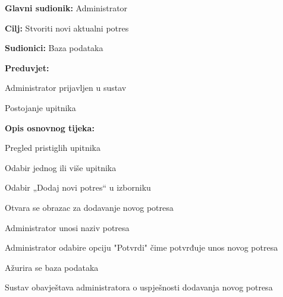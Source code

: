 					\noindent {}
					\begin{packed_item}
	
						\item \textbf{Glavni sudionik:} Administrator
						\item \textbf{Cilj:} Stvoriti novi aktualni potres
						\item \textbf{Sudionici:} Baza podataka
						\item \textbf{Preduvjet:} 
						\begin{packed_item}
							\item Administrator prijavljen u sustav
							\item Postojanje upitnika
						\end{packed_item}
						            
						\item \textbf{Opis osnovnog tijeka:}
						
						\item[] \begin{packed_enum}
	
							\item Pregled pristiglih upitnika
							\item Odabir jednog ili više upitnika
							\item Odabir „Dodaj novi potres“ u izborniku
							\item Otvara se obrazac za dodavanje novog potresa
							\item Administrator unosi naziv potresa
							\item Administrator odabire opciju "Potvrdi" čime potvrđuje unos novog potresa
							\item Ažurira se baza podataka
							\item Sustav obavještava administratora o uspješnosti dodavanja novog potresa
							
						\end{packed_enum}
					\end{packed_item}


